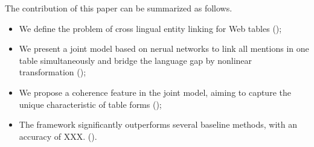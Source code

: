 The contribution of this paper can be summarized as follows.
\begin{itemize}
\itemsep0em
\item We define the problem of cross lingual entity linking for Web tables ();
\item We present a joint model based on nerual networks to link all mentions 
in one table simultaneously and bridge the language gap by 
nonlinear transformation ();
\item We propose a coherence feature in the joint model, 
aiming to capture the unique characteristic of table forms ();
\item The framework significantly outperforms
several baseline methods, with an accuracy of XXX. ().
\end{itemize}
